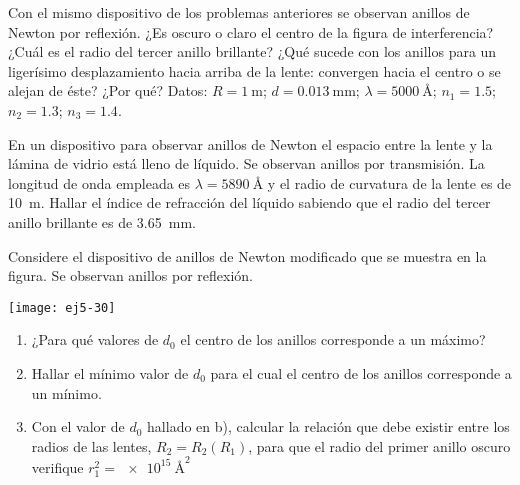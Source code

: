 \item Con el mismo dispositivo de los problemas anteriores se observan anillos de Newton por reflexión.
¿Es oscuro o claro el centro de la figura de interferencia?
¿Cuál es el radio del tercer anillo brillante?
¿Qué sucede con los anillos para un ligerísimo desplazamiento hacia arriba de la lente: convergen hacia el centro o se alejan de éste?
¿Por qué? 
Datos: $R = \SI{1}{\metre}$; $d = \SI{0.013}{\milli\metre}$; $\lambda = \SI{5000}{\angstrom}$; $n_1 = \num{1.5}$; $n_2 = \num{1.3}$; $n_3 = \num{1.4}$.



\item En un dispositivo para observar anillos de Newton el espacio entre la lente y la lámina de vidrio está lleno de líquido.
Se observan anillos por transmisión.
La longitud de onda empleada es $\lambda = \SI{5890}{\angstrom}$ y el radio de curvatura de la lente es de \SI{10}{\metre}.
Hallar el índice de refracción del líquido sabiendo que el radio del tercer anillo brillante es de \SI{3.65}{\milli\metre}.



\item
\begin{minipage}[t][0cm]{0.65\textwidth}
Considere el dispositivo de anillos de Newton modificado que se muestra en la figura.
Se observan anillos por reflexión. 
\end{minipage}
\begin{minipage}[c][2.2cm][t]{0.3\textwidth}
	\texttt{[image: ej5-30]}
\end{minipage}
\begin{enumerate}
	\item ¿Para qué valores de $d_0$ el centro de los anillos corresponde a un máximo? 
	\item Hallar el mínimo valor de $d_0$ para el cual el centro de los anillos corresponde a un mínimo. 
	\item Con el valor de $d_0$ hallado en b), calcular la relación que debe existir entre los radios de las lentes, $R_2 = R_2(R_1)$, para que el radio del primer anillo oscuro verifique $r_1^2 = \SI{e+15}{\angstrom\squared}$
\end{enumerate}

